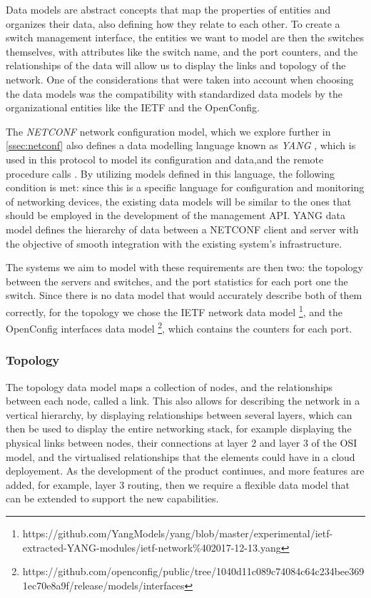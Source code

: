 Data models are abstract concepts that map the properties of entities and organizes their data, also defining how they relate to each other. To create a switch management interface, the entities we want to model are then 
the switches themselves, with attributes like the switch name, and the port counters, and the relationships of the data will allow us to display the links and topology of the network. One of the considerations that were taken into 
account when choosing the data models was the compatibility with standardized data models by the organizational entities like the IETF and the OpenConfig. 
\par The \textit{ NETCONF } network configuration model, which we explore further in \ref{ssec:netconf} also defines a data modelling language known as \textit{ YANG }, which is used in this protocol to model its configuration 
and data,and the remote procedure calls \cite { CITE - rfc 6020 }. By utilizing models defined in this language, the following condition is met: since this is a specific language for configuration and monitoring of networking 
devices, the existing data models will be similar to the ones that should be employed in the development of the management API. YANG data model defines the hierarchy of data between a NETCONF client and server with the objective
of smooth integration with the existing system's infrastructure. 
\par The systems we aim to model with these requirements are then two: the topology between the servers and switches, and the port statistics for each port one the switch. Since there is no data model that would accurately describe
both of them correctly, for the topology we chose the IETF network data model \footnote {https://github.com/YangModels/yang/blob/master/experimental/ietf-extracted-YANG-modules/ietf-network\%402017-12-13.yang}, and the 
OpenConfig interfaces data model \footnote {https://github.com/openconfig/public/tree/1040d11c089c74084c64c234bee3691ec70e8a9f/release/models/interfaces}, which contains the counters for each port.

\subsubsection {Topology}

The topology data model maps a collection of nodes, and the relationships between each node, called a link. This also allows for describing the network in a vertical hierarchy, by displaying relationships between several layers,
which can then be used to display the entire networking stack, for example displaying the physical links between nodes, their connections at layer 2 and layer 3 of the OSI model, and the virtualised relationships that the elements 
could have in a cloud deployement. As the development of the product continues, and more features are added, for example, layer 3 routing, then we require a flexible data model that can be extended to support the new capabilities.

